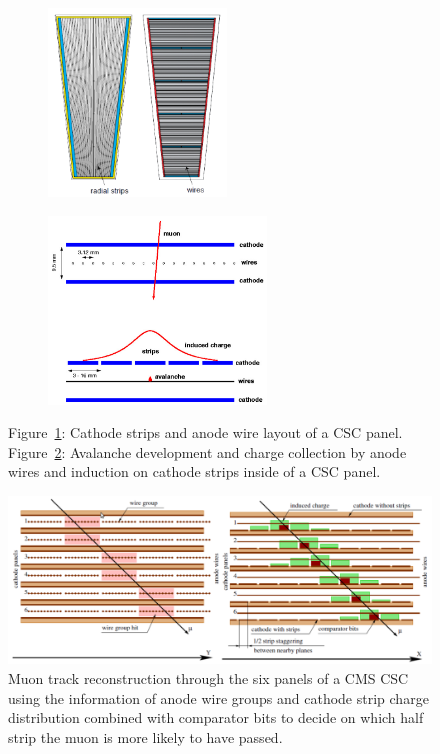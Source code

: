 	\begin{figure}[H]
		\begin{subfigure}{0.4\linewidth}
			\centering
			\includegraphics[height = 5cm]{fig/chapt3/CSC_layout.png}
			\caption{\label{fig:CSC-layout:A}}
		\end{subfigure}
		\begin{subfigure}{0.6\linewidth}
			\centering
			\includegraphics[height = 5cm]{fig/chapt3/CSC_avalanche.png}
			\caption{\label{fig:CSC-layout:B}}
		\end{subfigure}
		\caption{\label{fig:CSC-layout} Figure~\ref{fig:CSC-layout:A}: Cathode strips and anode wire layout of a CSC panel. Figure~\ref{fig:CSC-layout:B}: Avalanche development and charge collection by anode wires and induction on cathode strips inside of a CSC panel.}
	\end{figure}
	
	\begin{figure}[H]
		\centering
		\includegraphics[width=\linewidth]{fig/chapt3/CSC_track.png}
		\caption{\label{fig:CSC-track} Muon track reconstruction through the six panels of a CMS CSC using the information of anode wire groups and cathode strip charge distribution combined with comparator bits to decide on which half strip the muon is more likely to have passed.}
	\end{figure}
	
